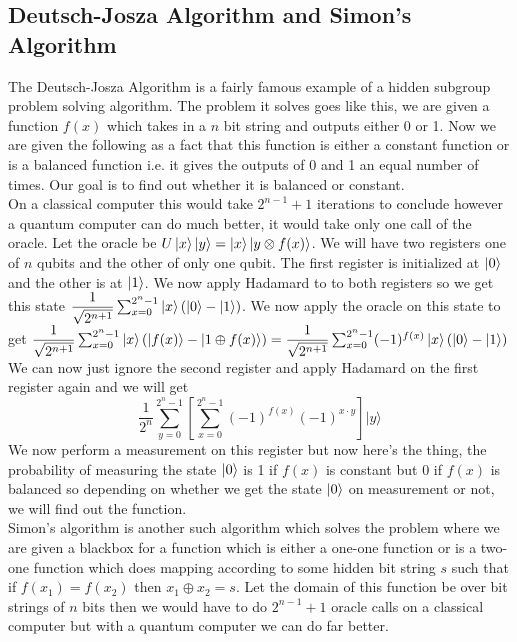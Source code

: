 \documentclass{report}
\begin{document}
\subsection{Deutsch-Josza Algorithm and Simon's Algorithm}
The Deutsch-Josza Algorithm is a fairly famous example of a hidden subgroup problem solving algorithm. The problem it solves goes like this, we are given a function $f(x)$ which takes in a $n$ bit string and outputs either 0 or 1. Now we are given the following as a fact that this function is either a constant function or is a balanced function i.e. it gives the outputs of 0 and 1 an equal number of times. Our goal is to find out whether it is balanced or constant.\\
On a classical computer this would take $2^{n-1}+1$ iterations to conclude however a quantum computer can do much better, it would take only one call of the oracle.
Let the oracle be $U\ket{x}\ket{y} = \ket{x}\ket{y \otimes f(x)}$. We will have two registers one of $n$ qubits and the other of only one qubit. The first register is initialized at $\ket{0}$ and the other is at $\ket{1}$. 
We now apply Hadamard to to both registers so we get this state $\dfrac{1}{\sqrt{2^{n+1}}}\sum_{x=0}^{2^n-1}\ket{x}(\ket{0}-\ket{1})$. We now apply the oracle on this state to get $\dfrac{1}{\sqrt{2^{n+1}}}\sum_{x=0}^{2^n-1}\ket{x}(\ket{f(x)}-\ket{1 \oplus f(x)}) = \dfrac{1}{\sqrt{2^{n+1}}}\sum_{x=0}^{2^n-1}(-1)^{f(x)}\ket{x}(\ket{0}-\ket{1})$\\
We can now just ignore the second register and apply Hadamard on the first register again and we will get $$\frac{1}{2^n}\sum_{y=0}^{2^n-1}\left[\sum_{x=0}^{2^n-1}(-1)^{f(x)}(-1)^{x \cdot y} \right]\vert y\rangle$$
We now perform a measurement on this register but now here's the thing, the probability of measuring the state $\ket{0}$ is 1 if $f(x)$ is constant but 0 if $f(x)$ is balanced so depending on whether we get the state $\ket{0}$ on measurement or not, we will find out the function.\\
Simon's algorithm is another such algorithm which solves the problem where we are given a blackbox for a function which is either a one-one function or is a two-one function which does mapping according to some hidden bit string $s$ such that if $f(x_1) = f(x_2)$ then $x_1 \oplus x_2 = s$. Let the domain of this function be over bit strings of $n$ bits then we would have to do $2^{n-1} + 1$ oracle calls on a classical computer but with a quantum computer we can do far better.\\
\end{document}
